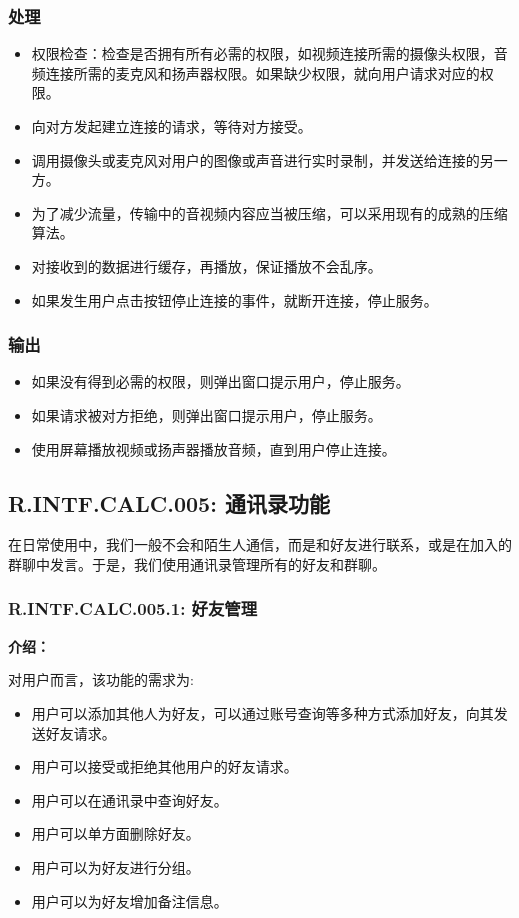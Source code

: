 \subsubsection{处理}
\begin{itemize}
  \item 权限检查：检查是否拥有所有必需的权限，如视频连接所需的摄像头权限，音频连接所需的麦克风和扬声器权限。如果缺少权限，就向用户请求对应的权限。
  \item 向对方发起建立连接的请求，等待对方接受。
  \item 调用摄像头或麦克风对用户的图像或声音进行实时录制，并发送给连接的另一方。
  \item 为了减少流量，传输中的音视频内容应当被压缩，可以采用现有的成熟的压缩算法。
  \item 对接收到的数据进行缓存，再播放，保证播放不会乱序。
  \item 如果发生用户点击按钮停止连接的事件，就断开连接，停止服务。
\end{itemize}
\subsubsection{输出}
\begin{itemize}
  \item 如果没有得到必需的权限，则弹出窗口提示用户，停止服务。
  \item 如果请求被对方拒绝，则弹出窗口提示用户，停止服务。
  \item 使用屏幕播放视频或扬声器播放音频，直到用户停止连接。
\end{itemize}

\subsection{R.INTF.CALC.005: 通讯录功能}
在日常使用中，我们一般不会和陌生人通信，而是和好友进行联系，或是在加入的群聊中发言。于是，我们使用通讯录管理所有的好友和群聊。

\subsubsection{R.INTF.CALC.005.1: 好友管理}
\textbf{介绍：}

对用户而言，该功能的需求为:
\begin{itemize}
  \item 用户可以添加其他人为好友，可以通过账号查询等多种方式添加好友，向其发送好友请求。
  \item 用户可以接受或拒绝其他用户的好友请求。
  \item 用户可以在通讯录中查询好友。
  \item 用户可以单方面删除好友。
  \item 用户可以为好友进行分组。
  \item 用户可以为好友增加备注信息。
\end{itemize}

